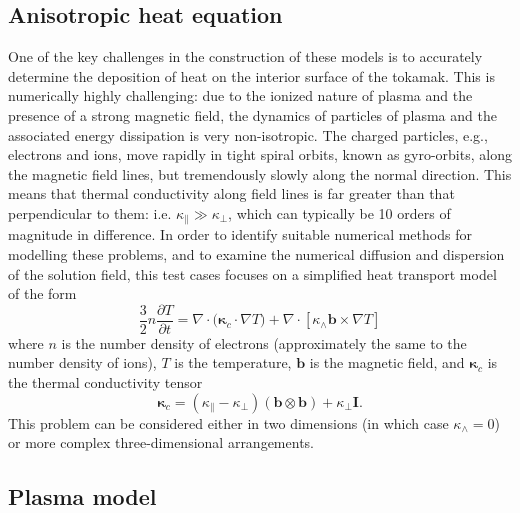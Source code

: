 \documentclass{article}
\begin{document}
\subsection{Anisotropic heat equation}

One of the key challenges in the construction of these models is to accurately
determine the deposition of heat on the interior surface of the tokamak. This is
numerically highly challenging: due to the ionized nature of plasma and the
presence of a strong magnetic field, the dynamics of particles of plasma and the
associated energy dissipation is very non-isotropic. The charged particles,
e.g., electrons and ions, move rapidly in tight spiral orbits, known as
gyro-orbits, along the magnetic field lines, but tremendously slowly along the
normal direction. This means that thermal conductivity along field lines is far
greater than that perpendicular to them: i.e.
$\kappa_{\parallel} \gg \kappa_{\perp}$, which can typically be 10 orders of
magnitude in difference. In order to identify suitable numerical methods for
modelling these problems, and to examine the numerical diffusion and dispersion
of the solution field, this test cases focuses on a simplified heat transport
model of the form
%
\[
  \frac{3}{2} n \frac{\partial T}{\partial t} = \nabla \cdot \big(\bm{\kappa}_c
  \cdot \nabla T \big) + \nabla \cdot [\kappa_{\wedge}\bm{b}\times\nabla T]
\]
%
where $n$ is the number density of electrons (approximately the same to the
number density of ions), $T$ is the temperature, $\bm{b}$ is the magnetic field,
and $\bm{\kappa}_c$ is the thermal conductivity tensor
\[
  \bm{\kappa}_c = (\kappa_{\parallel}-\kappa_{\perp}) (\bm{b}\otimes \bm{b}) +
  \kappa_{\perp}\bm{I}.
\]
This problem can be considered either in two dimensions (in which case
$\kappa_\wedge = 0$) or more complex three-dimensional arrangements.

\subsection{Plasma model}
\end{document}
